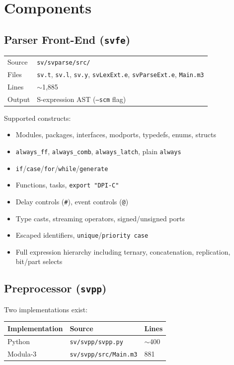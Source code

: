 \documentclass[11pt]{article}
\begin{document}
\section{Components}

\subsection{Parser Front-End (\texttt{svfe})}

\begin{tabular}{@{}ll@{}}
\toprule
Source & \texttt{sv/svparse/src/} \\
Files  & \texttt{sv.t}, \texttt{sv.l}, \texttt{sv.y},
         \texttt{svLexExt.e}, \texttt{svParseExt.e}, \texttt{Main.m3} \\
Lines  & $\sim$1,885 \\
Output & S-expression AST (\texttt{--scm} flag) \\
\bottomrule
\end{tabular}

\medskip\noindent
Supported constructs:
\begin{itemize}[nosep]
\item Modules, packages, interfaces, modports, typedefs, enums, structs
\item \texttt{always\_ff}, \texttt{always\_comb}, \texttt{always\_latch},
      plain \texttt{always}
\item \texttt{if}/\texttt{case}/\texttt{for}/\texttt{while}/\texttt{generate}
\item Functions, tasks, \texttt{export "DPI-C"}
\item Delay controls (\texttt{\#}), event controls (\texttt{@})
\item Type casts, streaming operators, signed/unsigned ports
\item Escaped identifiers, \texttt{unique}/\texttt{priority case}
\item Full expression hierarchy including ternary, concatenation,
      replication, bit/part selects
\end{itemize}

\subsection{Preprocessor (\texttt{svpp})}

Two implementations exist:

\begin{tabular}{@{}lll@{}}
\toprule
Implementation & Source & Lines \\
\midrule
Python & \texttt{sv/svpp/svpp.py} & $\sim$400 \\
Modula-3 & \texttt{sv/svpp/src/Main.m3} & 881 \\
\bottomrule
\end{tabular}
\end{document}
